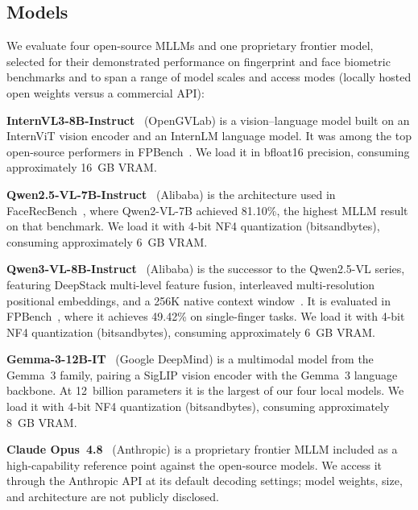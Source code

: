 \documentclass[journal]{IEEEtran}
\begin{document}
\subsection{Models}

We evaluate four open-source MLLMs and one proprietary frontier model,
selected for their demonstrated performance on fingerprint and face
biometric benchmarks and to span a range of model scales and access
modes (locally hosted open weights versus a commercial API):

\textbf{InternVL3-8B-Instruct}~\cite{internvl3} (OpenGVLab) is a
vision--language model built on an InternViT vision encoder and an
InternLM language model.
It was among the top open-source performers in FPBench~\cite{fpbench2025}.
We load it in bfloat16 precision, consuming approximately 16~GB VRAM.

\textbf{Qwen2.5-VL-7B-Instruct}~\cite{qwen25vl} (Alibaba) is the
architecture used in FaceRecBench~\cite{facerecbench2025}, where
Qwen2-VL-7B achieved 81.10\%, the highest MLLM result on that benchmark.
We load it with 4-bit NF4 quantization (bitsandbytes), consuming
approximately 6~GB VRAM.

\textbf{Qwen3-VL-8B-Instruct}~\cite{qwen3vl} (Alibaba) is the
successor to the Qwen2.5-VL series, featuring DeepStack multi-level
feature fusion, interleaved multi-resolution positional embeddings, and
a 256K native context window~\cite{qwen3vl}.
It is evaluated in FPBench~\cite{fpbench2025}, where it achieves 49.42\%
on single-finger tasks.
We load it with 4-bit NF4 quantization (bitsandbytes), consuming
approximately 6~GB VRAM.

\textbf{Gemma-3-12B-IT}~\cite{gemma3} (Google DeepMind) is a multimodal
model from the Gemma~3 family, pairing a SigLIP vision encoder with the
Gemma~3 language backbone. At 12~billion parameters it is the largest of
our four local models.
We load it with 4-bit NF4 quantization (bitsandbytes), consuming
approximately 8~GB VRAM.

\textbf{Claude Opus~4.8}~\cite{claudeopus} (Anthropic) is a proprietary
frontier MLLM included as a high-capability reference point against the
open-source models. We access it through the Anthropic API at its default
decoding settings; model weights, size, and architecture are not publicly
disclosed.
\end{document}
